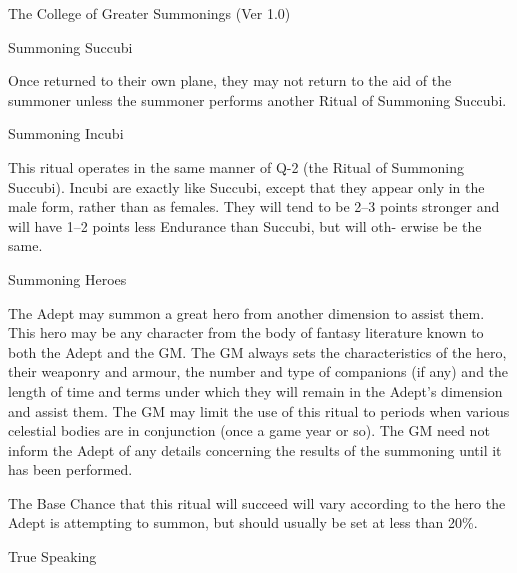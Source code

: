 \begin{Chapter}{The College of Greater Summonings (Ver 1.0)}
\begin{ritual}[Q-2]{Summoning Succubi}
\begin{effects}
Once returned to their own plane, they may not return to the aid of
the summoner unless the summoner performs another Ritual of Summoning
Succubi.
\end{effects}
\end{ritual}

\begin{ritual}[Q-3]{Summoning Incubi}

\begin{effects}
This ritual operates in the same manner of Q-2 (the Ritual of
Summoning Succubi).  Incubi are exactly like Succubi, except that they
appear only in the male form, rather than as females. They will tend
to be 2–3 points stronger and will have 1–2 points less Endurance than
Succubi, but will oth- erwise be the same.
\end{effects}
\end{ritual}

\begin{ritual}[Q-4]{Summoning Heroes}

\begin{effects}
The Adept may summon a great hero from another dimension to assist
them. This hero may be any character from the body of fantasy
literature known to both the Adept and the GM.  The GM always sets the
characteristics of the hero, their weaponry and armour, the number and
type of companions (if any) and the length of time and terms under
which they will remain in the Adept’s dimension and assist them. The
GM may limit the use of this ritual to periods when various celestial
bodies are in conjunction (once a game year or so).  The GM need not
inform the Adept of any details concerning the results of the
summoning until it has been performed.

The Base Chance that this ritual will succeed will vary according to
the hero the Adept is attempting to summon, but should usually be set
at less than 20\%.
\end{effects}
\end{ritual}

\begin{ritual}[Q-5]{True Speaking}


\end{ritual}
\end{Chapter}
